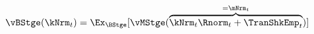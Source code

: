   \begin{equation}\begin{gathered}\begin{aligned}
\vBStge(\kNrm_{t}) & = \Ex_{\BStge}[\vMStge(\overbrace{\kNrm_{t} \Rnorm_{t} + \TranShkEmp_{t}}^{=\mNrm_{t}})]  \label{eq:vBStge}
      \end{aligned}\end{gathered}\end{equation}
